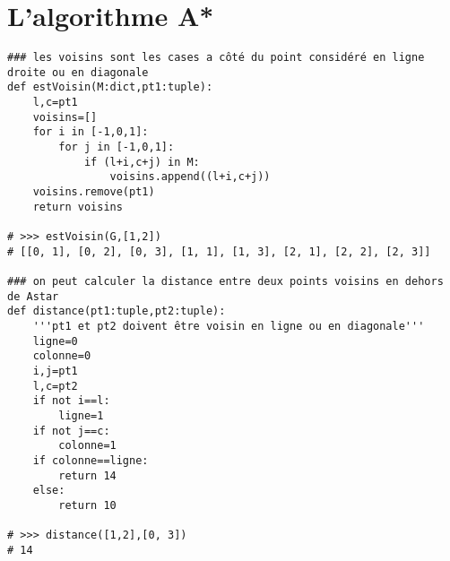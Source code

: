 \section{L'algorithme A*}

\begin{lstlisting}
### les voisins sont les cases a côté du point considéré en ligne droite ou en diagonale
def estVoisin(M:dict,pt1:tuple):
    l,c=pt1
    voisins=[]
    for i in [-1,0,1]:
        for j in [-1,0,1]:
            if (l+i,c+j) in M:
                voisins.append((l+i,c+j))
    voisins.remove(pt1)
    return voisins

# >>> estVoisin(G,[1,2])
# [[0, 1], [0, 2], [0, 3], [1, 1], [1, 3], [2, 1], [2, 2], [2, 3]]

### on peut calculer la distance entre deux points voisins en dehors de Astar
def distance(pt1:tuple,pt2:tuple):
    '''pt1 et pt2 doivent être voisin en ligne ou en diagonale'''
    ligne=0
    colonne=0
    i,j=pt1
    l,c=pt2
    if not i==l:
        ligne=1
    if not j==c:
        colonne=1
    if colonne==ligne:
        return 14
    else:
        return 10

# >>> distance([1,2],[0, 3])
# 14


\end{lstlisting}
